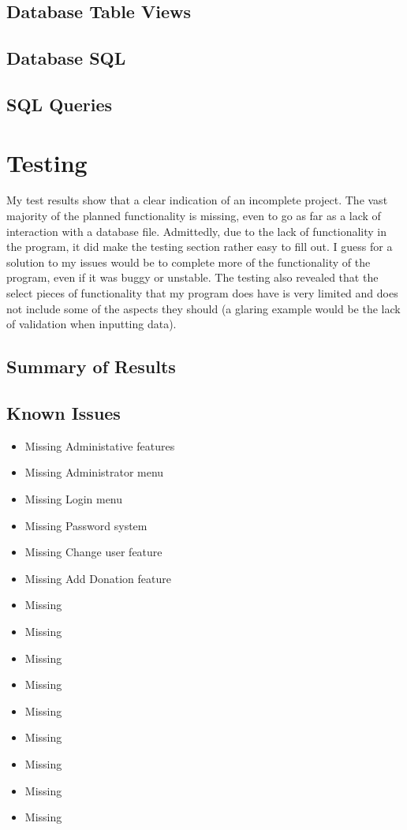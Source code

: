 \subsection{Database Table Views}

\subsection{Database SQL}

\subsection{SQL Queries}

\section{Testing}

My test results show that a clear indication of an incomplete project. The vast majority of the planned functionality is missing, even to go as far as a lack of interaction with a database file. Admittedly, due to the lack of functionality in the program, it did make the testing section rather easy to fill out. I guess for a solution to my issues would be to complete more of the functionality of the program, even if it was buggy or unstable. The testing also revealed that the select pieces of functionality that my program does have is very limited and does not include some of the aspects they should (a glaring example would be the lack of validation when inputting data).
\subsection{Summary of Results}

\subsection{Known Issues}
\begin{itemize}
    \item Missing Administative features
    \item Missing Administrator menu
    \item Missing Login menu
    \item Missing Password system
    \item Missing Change user feature
    \item Missing Add Donation feature
    \item Missing 
    \item Missing 
    \item Missing 
    \item Missing 
    \item Missing 
    \item Missing 
    \item Missing 
    \item Missing 
    \item Missing 


\end{itemize}


